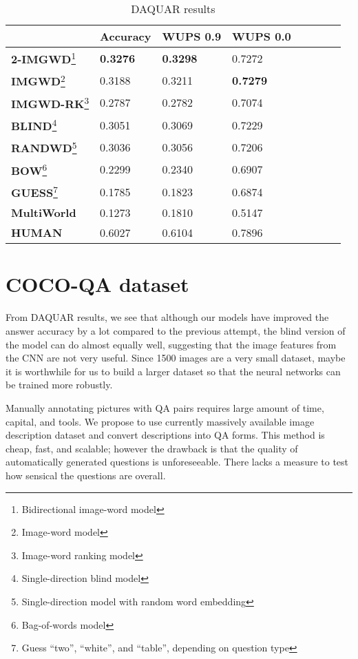 \begin{table}[h]
\centering
\caption{DAQUAR results}
\label{tab:daquar_results}
\begin{minipage}{10.5cm}
\begin{tabular}{l l l l l l l l}
\toprule
                 & \textbf{Accuracy} & \textbf{WUPS 0.9} & \textbf{WUPS 0.0}\\
\midrule
\textbf{2-IMGWD}\footnote{Bidirectional image-word model} & \textbf{0.3276} & \textbf{0.3298} & 0.7272\\
\textbf{IMGWD}\footnote{Image-word model}   & 0.3188   & 0.3211 & \textbf{0.7279}\\
\textbf{IMGWD-RK}\footnote{Image-word ranking model}   & 0.2787 & 0.2782 & 0.7074\\
\midrule
\textbf{BLIND}\footnote{Single-direction blind model}   & 0.3051   & 0.3069 & 0.7229\\
\textbf{RANDWD}\footnote{Single-direction model with random word embedding}  & 0.3036   & 0.3056 & 0.7206\\
\textbf{BOW}\footnote{Bag-of-words model}     &  0.2299  & 0.2340 & 0.6907\\
\textbf{GUESS}\footnote{Guess ``two'', ``white'', and ``table'', depending on question type}   & 0.1785   & 0.1823       & 0.6874\\
\textbf{MultiWorld \cite{malinowski14b}} & 0.1273 & 0.1810 & 0.5147\\
\midrule
\textbf{HUMAN} & 0.6027 & 0.6104 & 0.7896\\
\bottomrule
\end{tabular}
\end{minipage}
\end{table}

\section{COCO-QA dataset}
From DAQUAR results, we see that although our models have improved the answer accuracy by a lot compared to the previous attempt, the blind version of the model can do almost equally well, suggesting that the image features from the CNN are not very useful. Since 1500 images are a very small dataset, maybe it is worthwhile for us to build a larger dataset so that the neural networks can be trained more robustly.

Manually annotating pictures with QA pairs requires large amount of time, capital, and tools. We propose to use currently massively available image description dataset and convert descriptions into QA forms. This method is cheap, fast, and scalable; however the drawback is that the quality of automatically generated questions is unforeseeable. There lacks a measure to test how sensical the questions are overall.

